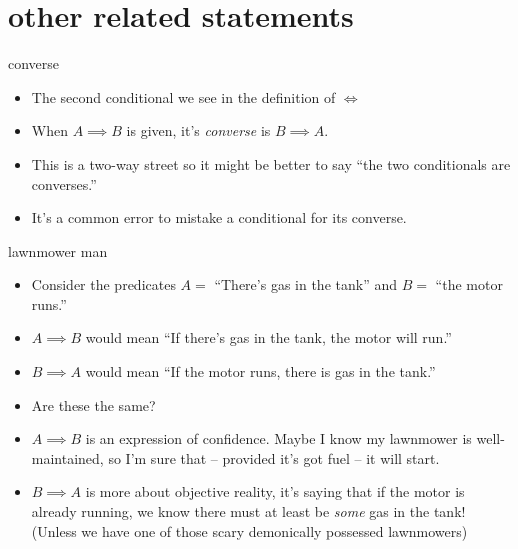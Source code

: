 \documentclass[landscape]{beamer}
\begin{document}
\section{other related statements}

\begin{frame}{converse}
\begin{itemize}
\item The second conditional we see in the definition of $\iff$ \pause
\item When $A \implies B$ is given, it's {\em converse} is $B \implies A$. \pause
\item This is a two-way street so it might be better to say ``the two conditionals are converses.'' \pause
\item It's a common error to mistake a conditional for its converse.
\end{itemize}
\end{frame}

\begin{frame}{lawnmower man}
\begin{itemize}
\item Consider the predicates $A =$ ``There's gas in the tank'' and $B =$ ``the motor runs.'' \pause
\item $A \implies B$ would mean ``If there's gas in the tank, the motor will run.''\pause
\item $B \implies A$ would mean ``If the motor runs, there is gas in the tank.''\pause
\item Are these the same? \pause
\item $A \implies B$ is an expression of confidence.  Maybe I know my lawnmower is well-maintained, so I'm sure that -- provided it's got fuel -- it will start.\pause
\item $B \implies A$ is more about objective reality, it's saying that if the motor is already running, we know there must at least be {\em some} gas in the tank! \pause (Unless we have one of those scary demonically possessed lawnmowers\textellipsis) 
\end{itemize}
\end{frame}
\end{document}
